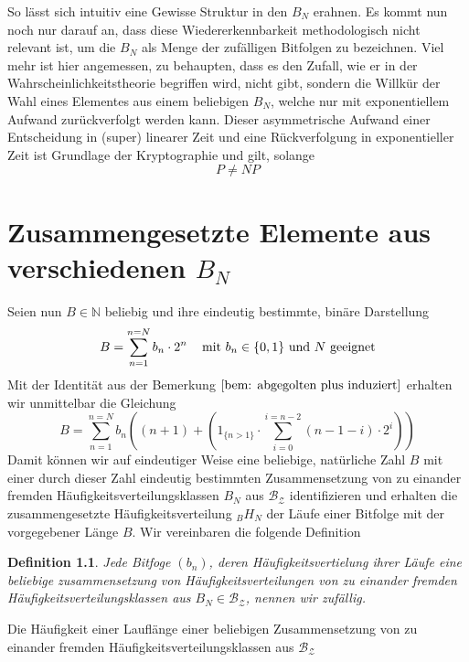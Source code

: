\documentclass[11pt,oneside,a4paper]{scrreprt}
\newtheorem{defi}{Definition}
\begin{document}
\noindent So lässt sich intuitiv eine Gewisse Struktur in den $B_N$ erahnen. Es kommt nun noch nur darauf an, dass diese Wiedererkennbarkeit methodologisch nicht relevant ist, um die $B_N$ als Menge der zufälligen Bitfolgen zu bezeichnen. Viel mehr ist hier angemessen, zu behaupten, dass es den Zufall, wie er in der Wahrscheinlichkeitstheorie begriffen wird, nicht gibt, sondern die Willkür der Wahl eines Elementes aus einem beliebigen $B_N$, welche nur mit exponentiellem Aufwand zurückverfolgt werden kann. Dieser asymmetrische Aufwand einer Entscheidung in (super) linearer Zeit und eine Rückverfolgung in exponentieller Zeit ist Grundlage der Kryptographie und gilt, solange
\begin{equation}
P \neq NP
\end{equation}

 
\chapter{Zusammengesetzte Elemente aus verschiedenen $B_N$}
Seien nun $B\in\mathbb N$ beliebig und ihre eindeutig bestimmte, binäre Darstellung
\begin{equation}
B = \sum_{n=1}^{n=N} b_n\cdot 2^n\text{\;\;\; mit } b_n\in\{0,1\}\text{ und }N\ \text{geeignet}
\end{equation} 
Mit der Identität aus der Bemerkung $\ref{bem: abgegolten plus induziert}$  erhalten wir unmittelbar die Gleichung
\begin{equation}\label{eqn:B als Summe von Läufe mal Häufigkeit}
B =  \sum_{n=1}^{n=N} b_n \left( \left(n+1\right)+\left( 1_{\{n>1\}}\cdot\sum_{i=0}^{i=n-2} (n-1-i) \cdot 2^i\right)\right)
\end{equation}
Damit können wir auf eindeutiger Weise eine beliebige, natürliche Zahl $B$ mit einer durch dieser Zahl eindeutig bestimmten Zusammensetzung von zu einander fremden Häufigkeitsverteilungsklassen $B_N$ aus $\mathcal{B_Z}$ identifizieren und erhalten die zusammengesetzte Häufigkeitsverteilung $_BH_N$ der Läufe einer Bitfolge mit der vorgegebener Länge $B$. Wir vereinbaren die folgende Definition
\begin{defi}\label{defi: Zufall}
Jede Bitfoge $(b_n)$, deren Häufigkeitsvertielung ihrer Läufe eine beliebige zusammensetzung von Häufigkeitsverteilungen von zu einander fremden Häufigkeitsverteilungsklassen aus $B_N \in \mathcal{B_Z}$, nennen wir zufällig.
\end{defi} 
Die Häufigkeit einer Lauflänge einer beliebigen Zusammensetzung von zu einander fremden Häufigkeitsverteilungsklassen aus $\mathcal{B_Z}$
\end{document}
